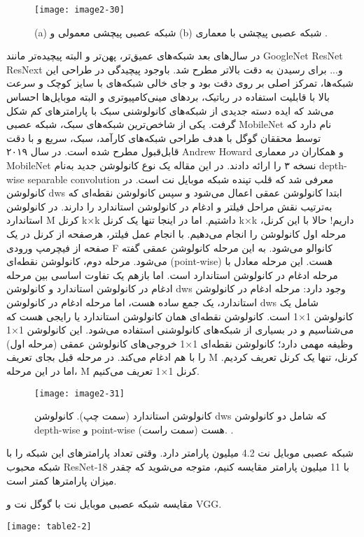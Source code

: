 \begin{figure}[h]
\centering
  \texttt{[image: image2-30]}
  \caption{(a) شبکه عصبی پیچشی معمولی و (b) شبکه عصبی پیچشی با معماری  \cite{ref1}.}
  \label{image2-30}
\end{figure}
\noindent
در سال‌های بعد شبکه‌های عمیق‌تر، پهن‌تر و البته پیچیده‌تر مانند GoogleNet ResNet ResNext و... برای رسیدن به دقت بالاتر مطرح شد. باوجود پیچیدگی در طراحی این شبکه‌ها، تمرکز اصلی ‌بر روی دقت بود و جای خالی شبکه‌های با سایز کوچک و سرعت بالا با قابلیت استفاده در رباتیک، بردهای مینی‌کامپیوتری و البته موبایل‌ها احساس می‌شد که ایده دسته جدیدی از شبکه‌های کانولوشنی سبک با پارامترهای کم‌ شکل گرفت. یکی از شاخص‌ترین شبکه‌های سبک، شبکه عصبی MobileNet نام دارد که توسط محققان گوگل با هدف طراحی شبکه‌های کارآمد، سبک، سریع و با دقت قابل‌قبول مطرح شده است. در سال ۲۰۱۹ Andrew Howard و همکاران در \cite{howard2019searching} معماری MobileNet نسخه ۳ را ارائه دادند. در این مقاله یک نوع کانولوشن جدید به‌نام depth-wise separable convolution معرفی شد که قلب تپنده شبکه موبایل نت است. در کانولوشن dws ابتدا کانولوشن عمقی اعمال می‌شود و سپس کانولوشن نقطه‌ای که به‌ترتیب نقش مراحل فیلتر و ادغام در کانولوشن استاندارد را دارند. در کانولوشن استاندارد M کرنل k×k داشتیم. اما در اینجا تنها یک کرنل k×k داریم! حالا با این کرنل، مرحله اول کانولوشن را انجام می‌دهیم. با انجام عمل فیلتر، هرصفحه از کرنل در یک صفحه از فیچرمپ ورودی F کانوالو می‌شود. به این مرحله کانولوشن عمقی گفته می‌شود. 
مرحله دوم، کانولوشن نقطه‌ای (point-wise) هست. این مرحله معادل با مرحله ادغام در کانولوشن استاندارد است. اما بازهم یک تفاوت اساسی بین مرحله ادغام در کانولوشن استاندارد و کانولوشن dws وجود دارد:
مرحله ادغام در کانولوشن استاندارد، یک جمع ساده هست، اما مرحله ادغام در کانولوشن dws شامل یک کانولوشن 1×1 است.
کانولوشن نقطه‌ای همان کانولوشن استاندارد یا رایجی هست که می‌شناسیم و در بسیاری از شبکه‌های کانولوشنی استفاده می‌شود. این کانولوشن 1×1 وظیفه مهمی دارد؛ کانولوشن نقطه‌ای 1×1 خروجی‌های کانولوشن عمقی (مرحله اول) را با هم ادغام می‌کند. در مرحله قبل بجای تعریف M کرنل، تنها یک کرنل تعریف کردیم. اما در این مرحله، M کرنل 1×1 تعریف می‌کنیم.

\begin{figure}[h]
\centering
  \texttt{[image: image2-31]}
  \caption{
  کانولوشن استاندارد (سمت چپ). کانولوشن dws که شامل دو کانولوشن depth-wise و point-wise هست (سمت راست). 
   \cite{ref1}.}
  \label{image2-31}
\end{figure}
\noindent
شبکه عصبی موبایل نت 4.2 میلیون پارامتر دارد. وقتی تعداد پارامترهای این شبکه را با شبکه محبوب ResNet-18 با 11 میلیون پارامتر مقایسه کنیم، متوجه می‌شوید که چقدر میزان پارامترها کمتر است.
\begin{table}
\centering
  \caption{ مقایسه شبکه عصبی موبایل نت با گوگل نت و VGG.}
  \label{tbl:2-2}
  \texttt{[image: table2-2]}
\end{table}

